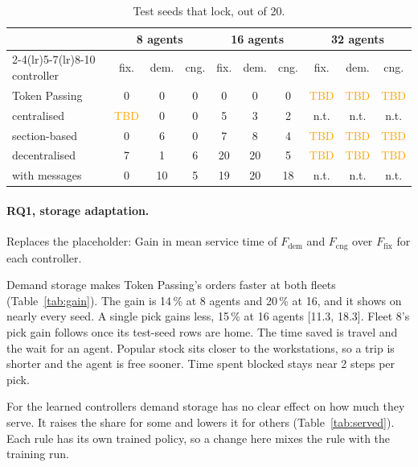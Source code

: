\documentclass[11pt,a4paper]{article}
\newcommand{\placeholder}[1]{\textcolor{plc}{\small Replaces the placeholder: #1}\par}
\newcommand{\tbd}{\textcolor{orange}{TBD}}
\begin{document}
\begin{table}[H]
  \centering
  \caption{Test seeds that lock, out of 20.}
  \label{tab:locks}
  \footnotesize
  \begin{tabular}{l ccc ccc ccc}
    \toprule
    & \multicolumn{3}{c}{8 agents} & \multicolumn{3}{c}{16 agents} & \multicolumn{3}{c}{32 agents} \\
    \cmidrule(lr){2-4}\cmidrule(lr){5-7}\cmidrule(lr){8-10}
    controller & fix. & dem. & cng. & fix. & dem. & cng. & fix. & dem. & cng. \\
    \midrule
    Token Passing  & 0 & 0 & 0 & 0 & 0 & 0 & \tbd & \tbd & \tbd \\
    centralised    & \tbd & 0 & 0 & 5 & 3 & 2 & n.t. & n.t. & n.t. \\
    section-based  & 0 & 6 & 0 & 7 & 8 & 4 & \tbd & \tbd & \tbd \\
    decentralised  & 7 & 1 & 6 & 20 & 20 & 5 & \tbd & \tbd & \tbd \\
    with messages  & 0 & 10 & 5 & 19 & 20 & 18 & n.t. & n.t. & n.t. \\
    \bottomrule
  \end{tabular}
\end{table}

\paragraph{RQ1, storage adaptation.}
\placeholder{Gain in mean service time of $F_{\mathrm{dem}}$ and $F_{\mathrm{cng}}$ over
$F_{\mathrm{fix}}$ for each controller.}
Demand storage makes Token Passing's orders faster at both fleets (Table~\ref{tab:gain}). The gain is
14\,\% at 8 agents and 20\,\% at 16, and it shows on nearly every seed. A single pick gains less, 15\,\% at 16 agents [11.3, 18.3]. Fleet 8's pick gain follows once its test-seed rows are home. The time saved is travel and
the wait for an agent. Popular stock sits closer to the workstations, so a trip is shorter and the
agent is free sooner. Time spent blocked stays near 2 steps per pick.

For the learned controllers demand storage has no clear effect on how much they serve. It raises
the share for some and lowers it for others (Table~\ref{tab:served}). Each rule has its own trained
policy, so a change here mixes the rule with the training run.
\end{document}
